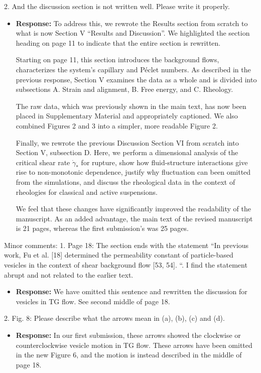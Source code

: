 \documentclass[11pt]{article}
\newcommand{\comment}[1]{{\color{blue} #1}}
\begin{document}
\noindent
\comment{2. And the discussion section is not written well. Please write it
properly.}
    \begin{itemize}
    \item[] {\bf Response:}
      To address this,
      we rewrote the Results section from scratch
    to what is now Section V ``Results and Discussion''.
    We highlighted the section heading on page 11 to indicate
    that the entire section is rewritten.

    Starting on page 11, this section introduces the background flows,
    characterizes the system's capillary and P\'eclet numbers.
    As described in the previous response, Section V examines the data
    as a whole and is divided into subsections A. Strain and alignment,
    B. Free energy, and C. Rheology.

    The raw data, which was previously shown in the
    main text, has now been placed in Supplementary Material
    and appropriately captioned.  We also combined
    Figures 2 and 3 into a simpler, more readable Figure 2.    

    Finally, we rewrote the previous Discussion Section VI from scratch
    into Section V, subsection D. Here,
    we perform a dimensional analysis of the critical shear rate $\dot \gamma_*$
    for rupture, show how fluid-structure interactions
    give rise to non-monotonic dependence, justify why
    fluctuation can been omitted from the simulations, and
    discuss the rheological data in the context of 
    rheologies for classical and active suspensions.

    We feel that these changes have significantly improved the readability
    of the manuscript.  As an added advantage, the main text of the
    revised manuscript is 21 pages, whereas the first submission's was
    25 pages.  
    \end{itemize}

\noindent
\comment{Minor comments: 1. Page 18: The section ends with 
the statement “In previous work, Fu
et al. [18] determined the permeability constant of particle-based
vesicles in the context of shear background flow [53, 54]. “. I find
the statement abrupt and not related to the earlier text.}

\begin{itemize}
  \item[] {\bf Response:}
    We have omitted this sentence and rewritten the discussion
    for vesicles in TG flow.  See second middle of page 18.   
\end{itemize}

\noindent
\comment{2. Fig. 8: Please describe what the arrows mean in (a), (b), (c) and
(d).}

\begin{itemize}
\item[] {\bf Response:}
  In our first submission, these arrows showed the clockwise or counterclockwise
  vesicle motion in TG flow.  These arrows have been omitted in the new Figure 6,
  and the motion is instead described in the middle of page 18. 
\end{itemize}
\end{document}
